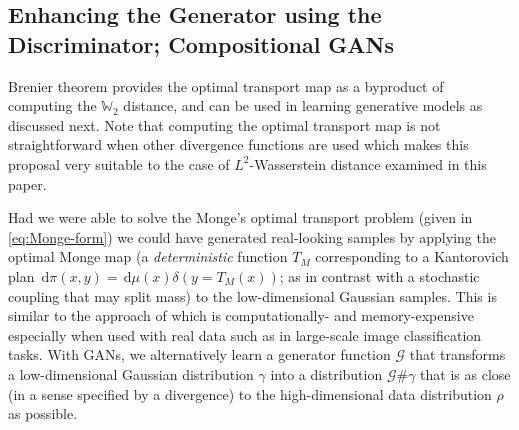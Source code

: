 \documentclass[10pt]{article}
\newcommand{\ud}{\,\mathrm{d}}
\newcommand{\W}{\mathds{W}}
\numberwithin{equation}{section}
\begin{document}
\subsection{Enhancing the Generator using the Discriminator; Compositional GANs}\label{sec:composite-wgan}
Brenier theorem provides the optimal transport map as a byproduct of computing the $\W_2$ distance, and can be used in learning generative models as discussed next. Note that computing the optimal transport map is not straightforward when other divergence functions are used which makes this proposal very suitable to the case of $L^2$-Wasserstein distance examined in this paper. 

\newcommand{\new}[1]{\color{blue}#1\color{black}}
Had we were able to solve the Monge's optimal transport problem (given in \eqref{eq:Monge-form}) we could have generated real-looking samples by applying the optimal Monge map (a {\em deterministic} function $T_M$ corresponding to a Kantorovich plan $\ud \pi(x,y) = \ud \mu(x) \delta (y=T_M(x))$; as in contrast with a stochastic coupling that may split mass) to the low-dimensional Gaussian samples. This is similar to the approach of \cite{mesa2018distributed} which is computationally- and memory-expensive especially when used with real data such as in large-scale image classification tasks. With GANs, we alternatively learn a generator function $\mathcal{G}$ that transforms a low-dimensional Gaussian distribution $\gamma$ into a distribution $\mathcal{G}\#\gamma$ that is as close (in a sense specified by a divergence) to the high-dimensional data distribution $\rho$ as possible. %
 
\end{document}
